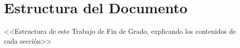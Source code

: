 
\section{Estructura del Documento} \label{sct:intro_estructura}

<<Estructura de este Trabajo de Fin de Grado, explicando los contenidos de cada sección>>

